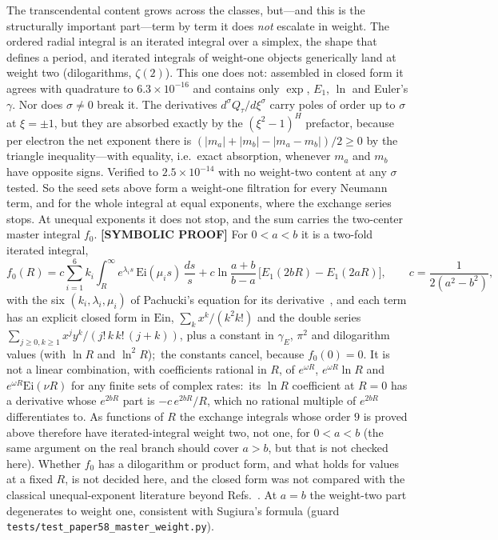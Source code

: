 \documentclass[aps,pra,twocolumn,superscriptaddress,longbibliography]{revtex4-2}
\begin{document}
The transcendental content grows across the classes, but---and this is the
structurally important part---term by term it does \emph{not} escalate in weight.  The
ordered radial integral is an iterated integral over a simplex, the shape
that defines a period, and iterated integrals of weight-one objects
generically land at weight two (dilogarithms, $\zeta(2)$).  This one does
not: assembled in closed form it agrees with quadrature to
$6.3 \times 10^{-16}$ and contains only $\exp$, $E_1$, $\ln$ and Euler's
$\gamma$.  Nor does $\sigma \neq 0$ break it.  The derivatives
$d^{\sigma} Q_{\tau}/d\xi^{\sigma}$ carry poles of order up to $\sigma$ at
$\xi = \pm 1$, but they are absorbed exactly by the $(\xi^2-1)^{H}$
prefactor, because per electron the net exponent there is
$(|m_a| + |m_b| - |m_a - m_b|)/2 \geq 0$ by the triangle inequality---with
equality, i.e.\ exact absorption, whenever $m_a$ and $m_b$ have opposite
signs.  Verified to $2.5 \times 10^{-14}$ with no weight-two content at
any $\sigma$ tested.  So the seed sets above form a weight-one filtration
for every Neumann term, and for the whole integral at equal exponents, where the
exchange series stops.  At unequal exponents it does not stop, and the sum
carries the two-center master integral $f_0$.  \textbf{[SYMBOLIC PROOF]} For $0<a<b$ it is a
two-fold iterated integral,
\begin{equation*}
f_0(R)=c\sum_{i=1}^{6}k_i\int_R^\infty e^{\lambda_is}\,\mathrm{Ei}(\mu_is)\,\frac{ds}{s}
+c\ln\frac{a+b}{b-a}\,\bigl[E_1(2bR)-E_1(2aR)\bigr],\qquad c=\frac{1}{2(a^2-b^2)},
\end{equation*}
with the six $(k_i,\lambda_i,\mu_i)$ of Pachucki's equation for its derivative~\cite{pachucki2009},
and each term has an explicit closed form in $\mathrm{Ein}$, $\sum_k x^k/(k^2k!)$ and the double
series $\sum_{j\ge0,k\ge1}x^jy^k/(j!\,k\,k!\,(j+k))$, plus a constant in $\gamma_E$, $\pi^2$ and
dilogarithm values (with $\ln R$ and $\ln^2R$);\ the constants cancel, because $f_0(0)=0$.  It is not a linear
combination, with coefficients rational in $R$, of $e^{\omega R}$, $e^{\omega R}\ln R$ and
$e^{\omega R}\mathrm{Ei}(\nu R)$ for any finite sets of complex rates:\ its $\ln R$ coefficient at
$R=0$ has a derivative whose $e^{2bR}$ part is $-c\,e^{2bR}/R$, which no rational multiple of
$e^{2bR}$ differentiates to.  As functions of $R$ the exchange integrals whose
order $9$ is proved above therefore have iterated-integral weight two, not one, for $0<a<b$
(the same argument on the real branch should cover $a>b$, but that is not checked here).  Whether $f_0$
has a dilogarithm or product form, and what holds for values at a fixed $R$, is not decided
here, and the closed form was not compared with the classical unequal-exponent literature
beyond Refs.~\cite{pachucki2009,lesiuk2014b}.  At $a=b$ the weight-two part degenerates to
weight one, consistent with Sugiura's formula (guard
\texttt{tests/test\_paper58\_master\_weight.py}).
\end{document}
